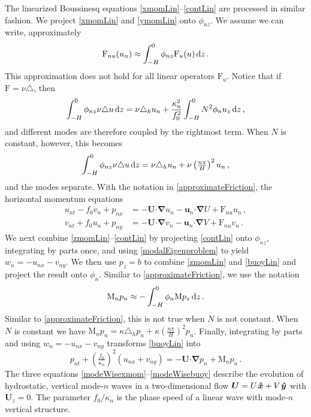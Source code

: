 \documentclass[12pt, oneside]{article}
\newcommand{\com}{\, ,}
\newcommand{\per}{\, .}
\newcommand{\beq}{\begin{equation}}
\newcommand{\eeq}{\end{equation}}
\newcommand{\bnabla}{\boldsymbol \nabla}
\newcommand{\bcdot}{\boldsymbol \cdot}
\newcommand{\hlap}{\triangle_h}
\newcommand{\lap}{\triangle}
\newcommand{\bu}{\boldsymbol u}
\newcommand{\bxh}{\hspace{0.1em} \boldsymbol{\hat x}}
\newcommand{\byh}{\hspace{0.1em}\boldsymbol{\hat y}}
\newcommand{\bU}{\boldsymbol{U}}
\newcommand{\id}{{\, \rm d}}
\newcommand{\friction}{\mathrm{F}}
\newcommand{\mixing}{\mathrm{M}}
\newcommand{\mode}{\phi}
\begin{document}
The linearized Boussinesq equations \eqref{xmomLin}--\eqref{contLin} are processed in similar fashion.  We project \eqref{xmomLin} and \eqref{ymomLin} onto $\mode_{nz}$. We assume we can write, approximately
\beq
\friction_{nu} (u_n) \approx \int_{-H}^0 \phi_{nz} \friction_u(u) \id z \per
\label{approximateFriction}
\eeq
This approximation does not hold for all linear operators $\friction_u$. Notice that if $\friction = \nu \lap$, then
\beq
\int_{-H}^0 \phi_{nz} \nu \lap u \id z = \nu \hlap u_n + \frac{\kappa_n^2}{f_0^2} \int_{-H}^0 N^2 \phi_n u_{z} \id z \com
\eeq
and different modes are therefore coupled by the rightmost term. When $N$ is constant, however, this becomes 
\beq
\int_{-H}^0 \phi_{nz} \nu \lap u \id z = \nu \hlap u_n + \nu \left ( \tfrac{n \pi}{H} \right )^2 u_n \com
\eeq
and the modes separate. With the notation in \eqref{approximateFriction}, the horizontal momentum equations 
\begin{align}
u_{nt} - f_0 v_n + p_{nx} &= - \bU \bcdot \bnabla u_n - \bu_n \bcdot \bnabla U + \friction_{nu} u_n \com \label{modeWisexmom} \\
v_{nt} + f_0 u_n + p_{ny} &= - \bU \bcdot \bnabla v_n - \bu_n \bcdot \bnabla V + \friction_{nu} v_n\per \label{modeWiseymom}
\end{align}
We next combine \eqref{zmomLin}--\eqref{contLin} by projecting \eqref{contLin} onto $\mode_{nz}$, integrating by parts once, and using \eqref{modalEigenproblem} to yield $w_n = - u_{nx} - v_{ny}$.  We then use $p_z = b$ to combine \eqref{zmomLin} and \eqref{buoyLin} and project the result onto $\mode_n$. Similar to \eqref{approximateFriction}, we use the notation 
\beq
\mixing_n p_n \approx - \int_{-H}^0 \phi_n \mixing p_z \id z \per
\eeq
Similar to \eqref{approximateFriction}, this is not true when $N$ is not constant. When $N$ is constant we have $\mixing_n p_n = \kappa \hlap p_n + \kappa \left ( \tfrac{n \pi}{H} \right )^2 p_n$. Finally, integrating by parts and using $w_n = - u_{nx} - v_{ny}$ transforms \eqref{buoyLin} into
\beq
p_{nt} + \left ( \tfrac{f_0}{\kappa_n} \right )^{\! 2} \left ( u_{nx} + v_{ny} \right ) = - \bU \bcdot \bnabla p_n + \mixing_n p_n \per
\label{modeWisebuoy}
\eeq
The three equations \eqref{modeWisexmom}--\eqref{modeWisebuoy} describe the evolution of hydrostatic, vertical mode-$n$ waves in a two-dimensional flow $\bU = U \bxh + V \byh$ with $\bU_{\! z} = 0$.  The parameter $f_0 / \kappa_n$ is the phase speed of a linear wave with mode-$n$ vertical structure.  

\appendix
\end{document}
